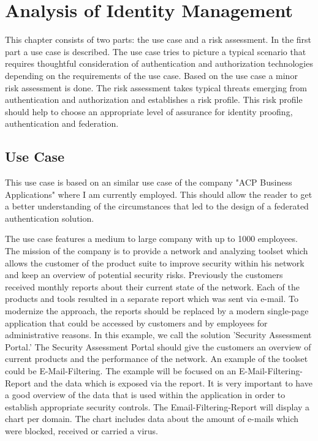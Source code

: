 \chapter{Analysis of Identity Management}\label{chap:analysis}
\chapterstart

This chapter consists of two parts: the use case and a risk assessment. In the first part a use case is described. The use case tries to picture a typical scenario that requires thoughtful consideration of authentication and authorization technologies depending on the requirements of the use case. Based on the use case a minor risk assessment is done. The risk assessment takes typical threats emerging from authentication and authorization and establishes a risk profile. This risk profile should help to choose an appropriate level of assurance for identity proofing, authentication and federation. 

\section{Use Case}
\label{usecase}
This use case is based on an similar use case of the company "ACP Business Applications" where I am currently employed. This should allow the reader to get a better understanding of the circumstances that led to the design of a federated authentication solution. 

The use case features a medium to large company with up to 1000 employees. The mission of the company is to provide a network and analyzing toolset which allows the customer of the product suite to improve security within his network and keep an overview of potential security risks. Previously the customers received monthly reports about their current state of the network. Each of the products and tools resulted in a separate report which was sent via e-mail. To modernize the approach, the reports should be replaced by a modern single-page application that could be accessed by customers and by employees for administrative reasons. In this example, we call the solution 'Security Assessment Portal.' The Security Assessment Portal should give the customers an overview of current products and the performance of the network. An example of the toolset could be E-Mail-Filtering. The example will be focused on an E-Mail-Filtering-Report and the data which is exposed via the report. It is very important to have a good overview of the data that is used within the application in order to establish appropriate security controls. The Email-Filtering-Report will display a chart per domain. The chart includes data about the amount of e-mails which were blocked, received or carried a virus. 

